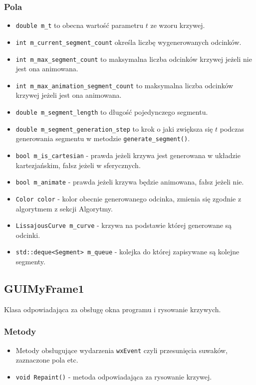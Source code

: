 			\subsubsection{Pola}
				\begin{itemize}
					\item \lstinline|double m_t| to obecna wartość parametru $t$ ze wzoru krzywej.
					\item \lstinline|int m_current_segment_count| określa liczbę wygenerowanych odcinków.
					\item \lstinline|int m_max_segment_count| to maksymalna liczba odcinków krzywej jeżeli nie jest ona animowana.
					\item \lstinline|int m_max_animation_segment_count| to maksymalna liczba odcinków krzywej jeżeli jest ona animowana.
					\item \lstinline|double m_segment_length| to długość pojedynczego segmentu.
					\item \lstinline|double m_segment_generation_step| to krok o jaki zwiększa się $t$ podczas generowania segmentu w metodzie \lstinline|generate_segment()|.
					\item \lstinline|bool m_is_cartesian| - prawda jeżeli krzywa jest generowana w układzie kartezjańskim, fałsz jeżeli w sferycznych.
					\item \lstinline|bool m_animate| - prawda jeżeli krzywa będzie animowana, fałsz jeżeli nie.
					\item \lstinline|Color color| - kolor obecnie generowanego odcinka, zmienia się zgodnie z algorytmem z sekcji Algorytmy.
					\item \lstinline|LissajousCurve m_curve| - krzywa na podstawie której generowane są odcinki.
					\item \lstinline|std::deque<Segment> m_queue| - kolejka do której zapisywane są kolejne segmenty.
				\end{itemize}
		\subsection{GUIMyFrame1}
			Klasa odpowiadająca za obsługę okna programu i rysowanie krzywych.
			\subsubsection{Metody}
				\begin{itemize}
					\item Metody obsługujące wydarzenia \lstinline|wxEvent| czyli przesunięcia suwaków, zaznaczone pola etc.
					\item \lstinline|void Repaint()| - metoda odpowiadająca za rysowanie krzywej.				
				\end{itemize}
